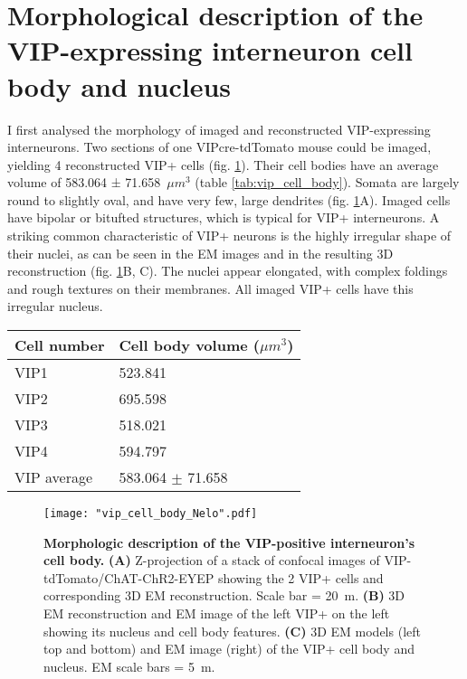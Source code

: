 \section{Morphological description of the VIP-expressing interneuron cell body and nucleus}
\label{sec:VIP cell body}
I first analysed the morphology of imaged and reconstructed VIP-expressing interneurons. Two sections of one VIPcre-tdTomato mouse could be imaged, yielding 4 reconstructed VIP+ cells (fig. \ref{fig:vip_cell_body}). Their cell bodies have an average volume of 583.064 ± 71.658~$\mu m^3$ (table \ref{tab:vip_cell_body}). Somata are largely round to slightly oval, and have very few, large dendrites (fig. \ref{fig:vip_cell_body}A). Imaged cells have bipolar or bitufted structures, which is typical for VIP+ interneurons. A striking common  characteristic of VIP+ neurons is the highly irregular shape of their nuclei, as can be seen in the EM images and in the resulting 3D reconstruction (fig. \ref{fig:vip_cell_body}B, C). The nuclei appear elongated, with complex foldings and rough textures on their membranes. All imaged VIP+ cells have this irregular nucleus.\\
\label{tab:vip_cell_body}
\begin{tabular}{|l|l|}
	\hline
	Cell number & Cell body volume ($\mu m^3$)\\
	\hline
	VIP1 & 523.841\\
	\hline
	VIP2 & 695.598\\
	\hline
	VIP3 & 518.021\\
	\hline
	VIP4 & 594.797\\
	\hline
    VIP average & 583.064 $\pm$ 71.658\\
	\hline
\end{tabular}
\begin{figure}
	\captionsetup[figure]{indentation=0pt}
	\texttt{[image: "vip\_cell\_body\_Nelo".pdf]}
	\caption{\textbf{Morphologic description of the VIP-positive interneuron's cell body.} \textbf{(A)} Z-projection of a stack of confocal images of VIP-tdTomato/ChAT-ChR2-EYEP showing the 2 VIP+ cells and corresponding 3D EM reconstruction. Scale bar = 20~\textmu m. \textbf{(B)} 3D EM reconstruction and EM image of the left VIP+ on the left showing its nucleus and cell body features. \textbf{(C)} 3D EM models (left top and bottom) and EM image (right) of the VIP+ cell body and nucleus. EM scale bars = 5~\textmu m.}
	\label{fig:vip_cell_body}
\end{figure}
